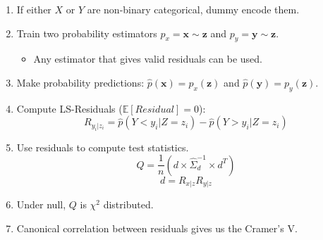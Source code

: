 \documentclass{beamer}
\begin{document}
\begin{frame}
	\frametitle{}
	\begin{enumerate}
		\item If either $ X $ or $ Y $ are non-binary categorical, dummy encode them.
		\item Train two probability estimators $ p_x = \bm{x} \sim \bm{z} $ and
			$ p_y = \bm{y} \sim \bm{z} $.
			\begin{itemize}
				\item Any estimator that gives valid residuals can be used.
			\end{itemize}
		\item Make probability predictions:
			$ \hat{p}(\bm{x}) = p_x(\bm{z}) $ and $ \hat{p}(\bm{y}) = p_y(\bm{\bm{z}}) $.
		\item Compute LS-Residuals ($ \mathbb{E}[\textit{Residual}] = 0 $):
			$$ R_{y_i | z_i} = \hat{p}(Y < y_i | Z=z_i) - \hat{p}(Y>y_i|Z=z_i) $$
		\item Use residuals to compute test statistics.
			$$ Q = \frac{1}{n} (d \times \hat{\Sigma}_d^{-1} \times d^T) $$
			$$ d = R_{x|z} R_{y|z} $$
		\item Under null, $ Q $ is $ \chi^2 $ distributed.
		\item Canonical correlation between residuals gives us the Cramer's V.
	\end{enumerate}
\end{frame}
\end{document}
